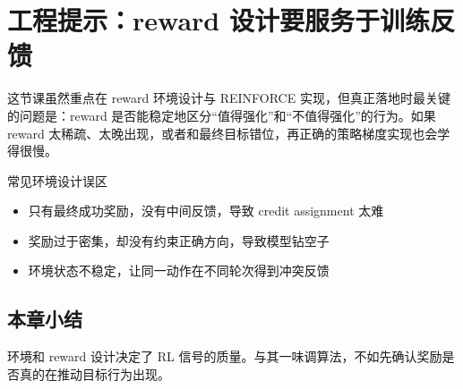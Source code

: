 \section{工程提示：reward 设计要服务于训练反馈}
这节课虽然重点在 reward 环境设计与 REINFORCE 实现，但真正落地时最关键的问题是：reward 是否能稳定地区分“值得强化”和“不值得强化”的行为。如果 reward 太稀疏、太晚出现，或者和最终目标错位，再正确的策略梯度实现也会学得很慢。

\begin{warningbox}{常见环境设计误区}
\begin{itemize}
  \item 只有最终成功奖励，没有中间反馈，导致 credit assignment 太难
  \item 奖励过于密集，却没有约束正确方向，导致模型钻空子
  \item 环境状态不稳定，让同一动作在不同轮次得到冲突反馈
\end{itemize}
\end{warningbox}

\subsection{本章小结}
环境和 reward 设计决定了 RL 信号的质量。与其一味调算法，不如先确认奖励是否真的在推动目标行为出现。

\newpage
